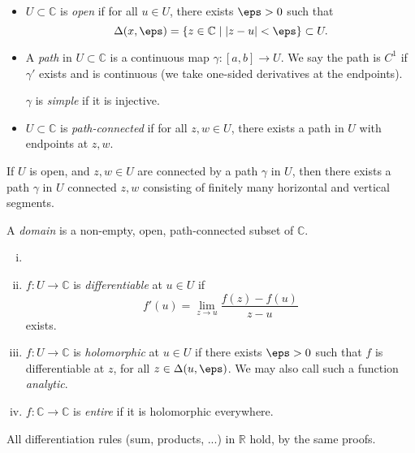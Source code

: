 \documentclass[12pt]{article}
\begin{document}
\begin{itemize}
	\item $U \subset \mathbb{C}$ is \emph{open} if for all $u \in U$, there exists $\eps > 0$ such that
		\[
			\Delta(x, \eps) = \{z \in \mathbb{C} \mid |z - u| < \eps\} \subset U
		.\]
	\item A \emph{path} in $U \subset \mathbb{C}$ is a continuous map $\gamma : [a, b] \to U$. We say the path is $C^{1}$ if $\gamma'$ exists and is continuous (we take one-sided derivatives at the endpoints).

		$\gamma$ is \emph{simple} if it is injective.
	\item $U \subset \mathbb{C}$ is \emph{path-connected} if for all $z, w \in U$, there exists a path in $U$ with endpoints at $z, w$.
\end{itemize}
\begin{remark}
	If $U$ is open, and $z, w \in U$ are connected by a path $\gamma$ in $U$, then there exists a path $\gamma$ in $U$ connected $z, w$ consisting of finitely many horizontal and vertical segments.
\end{remark}

\begin{definition}
	A \emph{domain} is a non-empty, open, path-connected subset of $\mathbb{C}$.
\end{definition}

\begin{definition}
	\begin{enumerate}[(i)]
		\item[]
		\item $f : U \to \mathbb{C}$ is \emph{differentiable} at $u \in U$ if
			\[
			f'(u) = \lim_{z \to u} \frac{f(z) - f(u)}{z - u}
			\]
			exists.
		\item $f : U \to \mathbb{C}$ is \emph{holomorphic} at $u \in U$ if there exists $\eps > 0$ such that $f$ is differentiable at $z$, for all $z \in \Delta(u, \eps)$. We may also call such a function \emph{analytic}.
		\item $f : \mathbb{C} \to \mathbb{C}$ is \emph{entire} if it is holomorphic everywhere.
	\end{enumerate}
\end{definition}

\begin{remark}
	All differentiation rules (sum, products, ...) in $\mathbb{R}$ hold, by the same proofs.
\end{remark}
\end{document}
